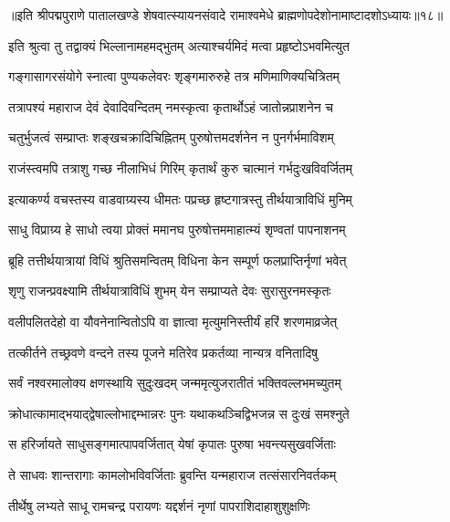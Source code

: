 {॥इति श्रीपद्मपुराणे पातालखण्डे शेषवात्स्यायनसंवादे रामाश्वमेधे ब्राह्मणोपदेशोनामाष्टादशोऽध्यायः॥१८॥}



\twolineshloka
{इति श्रुत्वा तु तद्वाक्यं भिल्लानामहमद्भुतम्}
{अत्याश्चर्यमिदं मत्वा प्रहृष्टोऽभवमित्युत}%

\twolineshloka
{गङ्गासागरसंयोगे स्नात्वा पुण्यकलेवरः}
{शृङ्गमारुरुहे तत्र मणिमाणिक्यचित्रितम्}%

\twolineshloka
{तत्रापश्यं महाराज देवं देवादिवन्दितम्}
{नमस्कृत्वा कृतार्थोऽहं जातोन्नप्राशनेन च}%

\twolineshloka
{चतुर्भुजत्वं सम्प्राप्तः शङ्खचक्रादिचिह्नितम्}
{पुरुषोत्तमदर्शनेन न पुनर्गर्भमाविशम्}%

\twolineshloka
{राजंस्त्वमपि तत्राशु गच्छ नीलाभिधं गिरिम्}
{कृतार्थं कुरु चात्मानं गर्भदुःखविवर्जितम्}%

\twolineshloka
{इत्याकर्ण्य वचस्तस्य वाडवाग्र्यस्य धीमतः}
{पप्रच्छ हृष्टगात्रस्तु तीर्थयात्राविधिं मुनिम्}%


\twolineshloka
{साधु विप्राग्र्य हे साधो त्वया प्रोक्तं ममानघ}
{पुरुषोत्तममाहात्म्यं शृण्वतां पापनाशनम्}%

\twolineshloka
{ब्रूहि तत्तीर्थयात्रायां विधिं श्रुतिसमन्वितम्}
{विधिना केन सम्पूर्ण फलप्राप्तिर्नृणां भवेत्}%


\twolineshloka
{शृणु राजन्प्रवक्ष्यामि तीर्थयात्राविधिं शुभम्}
{येन सम्प्राप्यते देवः सुरासुरनमस्कृतः}%

\twolineshloka
{वलीपलितदेहो वा यौवनेनान्वितोऽपि वा}
{ज्ञात्वा मृत्युमनिस्तीर्यं हरिं शरणमाव्रजेत्}%

\twolineshloka
{तत्कीर्तने तच्छ्रवणे वन्दने तस्य पूजने}
{मतिरेव प्रकर्तव्या नान्यत्र वनितादिषु}%

\twolineshloka
{सर्वं नश्वरमालोक्य क्षणस्थायि सुदुःखदम्}
{जन्ममृत्युजरातीतं भक्तिवल्लभमच्युतम्}%

\twolineshloka
{क्रोधात्कामाद्भयाद्द्वेषाल्लोभाद्दम्भान्नरः पुनः}
{यथाकथञ्चिद्विभजन्न स दुःखं समश्नुते}%

\twolineshloka
{स हरिर्जायते साधुसङ्गमात्पापवर्जितात्}
{येषां कृपातः पुरुषा भवन्त्यसुखवर्जिताः}%

\twolineshloka
{ते साधवः शान्तरागाः कामलोभविवर्जिताः}
{ब्रुवन्ति यन्महाराज तत्संसारनिवर्तकम्}%

\twolineshloka
{तीर्थेषु लभ्यते साधू रामचन्द्र परायणः}
{यद्दर्शनं नृणां पापराशिदाहाशुशुक्षणिः}%


